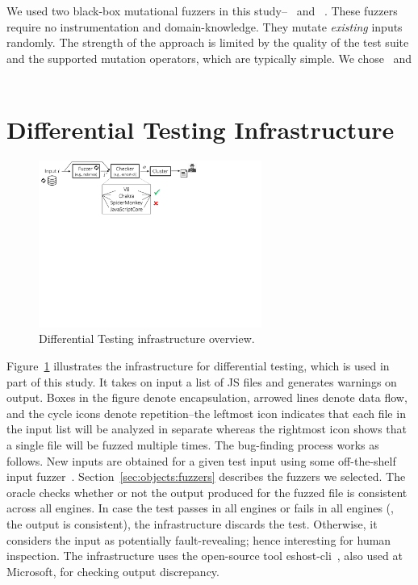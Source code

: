 \documentclass[10pt,conference,anonymous]{IEEEtran}
\begin{document}
We used two black-box mutational fuzzers in this
study--\radamsa~\cite{radamsa} and \quickfuzz~\cite{quickfuzz}. These
fuzzers require no instrumentation and domain-knowledge. They mutate
\emph{existing} inputs randomly. The strength of the approach is
limited by the quality of the test suite and the supported mutation
operators, which are typically simple. We chose \radamsa\ and
\quickfuzz\  

\section{Differential Testing Infrastructure}
\label{sec:design}

\begin{figure}[t!]
  \centering
  \includegraphics[trim=0 350 0 0,clip,width=0.65\textwidth]{diff-testing-runtimes}
  \caption{\label{fig:workflow}Differential Testing infrastructure overview.}
\end{figure}

Figure~\ref{fig:workflow} illustrates the infrastructure for
differential testing, which is used in part of this study. It takes on
input a list of JS files and generates warnings on output. Boxes in
the figure denote encapsulation, arrowed lines denote data flow, and
the cycle icons denote repetition--the leftmost icon indicates that
each file in the input list will be analyzed in separate whereas the
rightmost icon shows that a single file will be fuzzed multiple times.
The bug-finding process works as follows. New inputs are obtained for
a given test input using some off-the-shelf input
fuzzer~\cite{fuzz-testing-history}.
Section~\ref{sec:objects:fuzzers} describes the fuzzers we selected.
The oracle checks whether or not the output produced for the fuzzed
file is consistent across all engines. In case the test passes in all
engines or fails in all engines (\ie{}, the output is consistent), the
infrastructure discards the test. Otherwise, it considers the input as
potentially fault-revealing; hence interesting for human
inspection. The infrastructure uses the
open-source tool eshost-cli~\cite{eshost-cli}, also used at
Microsoft, for checking output discrepancy. 
\end{document}
